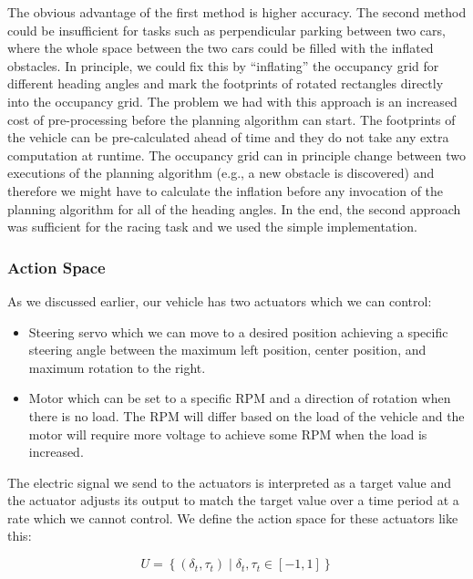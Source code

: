 The obvious advantage of the first method is higher accuracy. The second method could be insufficient for tasks such as perpendicular parking between two cars, where the whole space between the two cars could be filled with the inflated obstacles. In principle, we could fix this by ``inflating'' the occupancy grid for different heading angles and mark the footprints of rotated rectangles directly into the occupancy grid. The problem we had with this approach is an increased cost of pre-processing before the planning algorithm can start. The footprints of the vehicle can be pre-calculated ahead of time and they do not take any extra computation at runtime. The occupancy grid can in principle change between two executions of the planning algorithm (e.g., a new obstacle is discovered) and therefore we might have to calculate the inflation before any invocation of the planning algorithm for all of the heading angles. In the end, the second approach was sufficient for the racing task and we used the simple implementation.

\subsubsection{Action Space}

As we discussed earlier, our vehicle has two actuators which we can control:
\begin{itemize}
	\item Steering servo which we can move to a desired position achieving a specific steering angle between the maximum left position, center position, and maximum rotation to the right.
	
	\item Motor which can be set to a specific \gls{RPM} and a direction of rotation when there is no load. The \gls*{RPM} will differ based on the load of the vehicle and the motor will require more voltage to achieve some RPM when the load is increased.
\end{itemize}

The electric signal we send to the actuators is interpreted as a target value and the actuator adjusts its output to match the target value over a time period at a rate which we cannot control. We define the action space for these actuators like this:

\[
	U=\left\{ \left( \delta_t,\tau_t\right) \mid \delta_t,\tau_t\in\left[-1, 1\right] \right\}
\]

